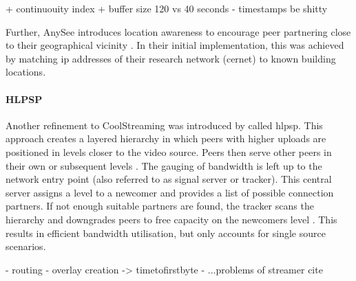 + continuouity index
+ buffer size 120 vs 40 seconds
- timestamps be shitty

Further, AnySee introduces location awareness to encourage peer partnering close to their geographical vicinity \citep[\S{V.B.1}]{anysee}. In their initial implementation, this was achieved by matching \gls{ip} addresses of their research network (\gls{cernet}) to known building locations.

\paragraph{HLPSP}
Another refinement to CoolStreaming was introduced by \citet*{hlpsp} called \gls{hlpsp}. This approach creates a layered hierarchy in which peers with higher uploads are positioned in levels closer to the video source. Peers then serve other peers in their own or subsequent levels \cite[\S3]{hlpsp}. The gauging of bandwidth is left up to the network entry point (also referred to as signal server or tracker). This central server assigns a level to a newcomer and provides a list of possible connection partners. If not enough suitable partners are found, the tracker scans the hierarchy and downgrades peers to free capacity on the newcomers level \cite[\S3.3.2]{hlpsp}. This results in efficient bandwidth utilisation, but only accounts for single source scenarios.

- routing
- overlay creation -> timetofirstbyte
- ...problems of streamer cite
